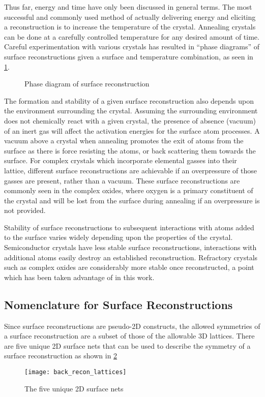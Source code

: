 Thus far, energy and time have only been discussed in general terms. The most successful and commonly used method of actually delivering energy and eliciting a reconstruction is to increase the temperature of the crystal. Annealing crystals can be done at a carefully controlled temperature for any desired amount of time. Careful experimentation with various crystals has resulted in ``phase diagrams'' of surface reconstructions given a surface and temperature combination, as seen in \cref{fig:back_recon_phase}.
\begin{figure}
    \centering
    \caption{\label{fig:back_recon_phase}Phase diagram of surface reconstruction}
\end{figure}

The formation and stability of a given surface reconstruction also depends upon the environment surrounding the crystal. Assuming the surrounding environment does not chemically react with a given crystal, the presence of absence (vacuum) of an inert gas will affect the activation energies for the surface atom processes. A vacuum above a crystal when annealing promotes the exit of atoms from the surface as there is force resisting the atoms, or back scattering them towards the surface. For complex crystals which incorporate elemental gasses into their lattice, different surface reconstructions are achievable if an overpressure of those gasses are present, rather than a vacuum. These surface reconstructions are commonly seen in the complex oxides, where oxygen is a primary constituent of the crystal and will be lost from the surface during annealing if an overpressure is not provided.

Stability of surface reconstructions to subsequent interactions with atoms added to the surface varies widely depending upon the properties of the crystal. Semiconductor crystals have less stable surface reconstructions, interactions with additional atoms easily destroy an established reconstruction. Refractory crystals such as complex oxides are considerably more stable once reconstructed, a point which has been taken advantage of in this work.

\subsection{Nomenclature for Surface Reconstructions}
Since surface reconstructions are pseudo-2D constructs, the allowed symmetries of a surface reconstruction are a subset of those of the allowable 3D lattices. There are five unique 2D surface nets that can be used to describe the symmetry of a surface reconstruction as shown in \cref{fig:back_recon_lattices}
\begin{figure}
    \centering
    \texttt{[image: back\_recon\_lattices]}
    \caption{\label{fig:back_recon_lattices}The five unique 2D surface nets\cite{ohring2001materials}}
\end{figure}

